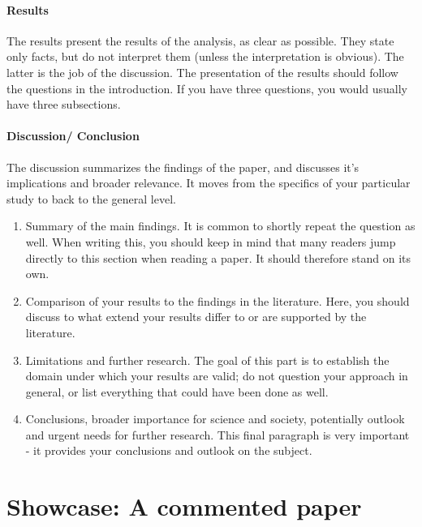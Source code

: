 \documentclass{tufte-book}
\begin{document}
\paragraph{Results} The results present the results of the analysis, as clear as possible. They state only facts, but do not interpret them (unless the interpretation is obvious). The latter is the job of the discussion. The presentation of the results should follow the questions in the introduction. If you have three questions, you would usually have three subsections. 

\paragraph{Discussion/ Conclusion} The discussion summarizes the findings of the paper, and discusses it's implications and broader relevance. It moves from the specifics of your particular study to back to the general level. 

\begin{enumerate}
\item Summary of the main findings. It is common to shortly repeat the question as well. When writing this, you should keep in mind that many readers jump directly to this section when reading a paper. It should therefore stand on its own. 
\item Comparison of your results to the findings in the literature. Here, you should discuss to what extend your results differ to or are supported by the literature. 
\item Limitations and further research. The goal of this part is to establish the domain under which your results are valid; do not question your approach in general, or list everything that could have been done as well. 
\item Conclusions, broader importance for science and society, potentially outlook and urgent needs for further research. This final paragraph is very important - it provides your conclusions and outlook on the subject. 
\end{enumerate} 



\section{Showcase: A commented paper}
\end{document}
